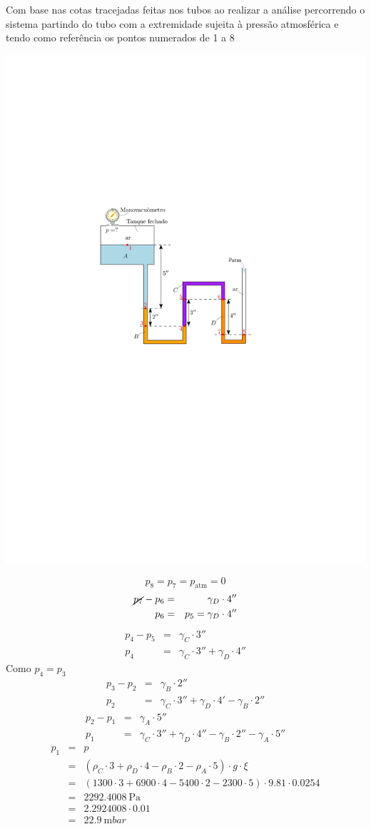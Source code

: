 \documentclass[
	a4paper,
	12pt,
	brazilian
]{article}
\begin{document}
	Com base nas cotas tracejadas feitas nos tubos ao realizar a análise percorrendo o sistema partindo do tubo com a extremidade sujeita à pressão atmosférica e tendo como referência os pontos numerados de 1 a 8
	\begin{center}
		\includegraphics[width=.7\linewidth]{assets/images/pontos_5}
	\end{center}
	\begin{equation}
		p_{8}=p_{7}=p_{\textrm{atm}}=0
	\end{equation}
	\begin{eqnarray}
		\cancel{p_{7}}-p_{6}&=&\gamma_{D}\cdot 4''\\
		p_{6}&=&p_{5}=\gamma_{D}\cdot 4''
	\end{eqnarray}
	\begin{eqnarray}
		p_{4}-p_{5}&=&\gamma_{C}\cdot 3''\\
		p_{4}&=&\gamma_{C}\cdot 3''+\gamma_{D}\cdot 4''
	\end{eqnarray}
	Como $p_{4}=p_{3}$
	\begin{eqnarray}
		p_{3}-p_{2}&=&\gamma_{B}\cdot 2''\\
		p_{2}&=&\gamma_{C}\cdot 3''+\gamma_{D}\cdot 4'-\gamma_{B}\cdot 2''
	\end{eqnarray}
	\begin{eqnarray}
		p_{2}-p_{1}&=&\gamma_{A}\cdot 5''\\
		p_{1}&=&\gamma_{C}\cdot 3''+\gamma_{D}\cdot 4''-\gamma_{B}\cdot 2''-\gamma_{A}\cdot 5''
	\end{eqnarray}
	\begin{eqnarray}
		p_{1}&=&p\\
		&=&(\rho_{C}\cdot 3+\rho_{D}\cdot 4-\rho_{B}\cdot 2-\rho_{A}\cdot 5)\cdot g\cdot\xi\\
		&=&(1300\cdot 3+6900\cdot 4-5400\cdot 2-2300\cdot 5)\cdot 9.81\cdot 0.0254\\
		&=&\SI{2292.4008}{\pascal}\\
		&=&2.2924008\cdot 0.01\\
		&=&\SI{22.9}{\milli bar}
	\end{eqnarray}
\end{document}
